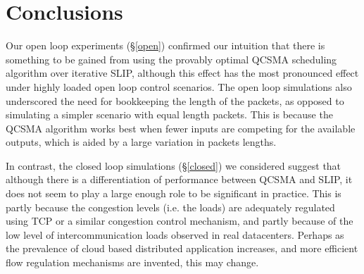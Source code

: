 \documentclass[11pt]{article}%
\begin{document}
\section{Conclusions}

Our open loop experiments (\S\ref{open}) confirmed our intuition that there is something to be gained from using the provably optimal QCSMA scheduling algorithm over iterative SLIP, although this effect has the most pronounced effect under highly loaded open loop control scenarios.  The open loop simulations also underscored the need for bookkeeping the length of the packets, as opposed to simulating a simpler scenario with equal length packets.  This is because the QCSMA algorithm works best when fewer inputs are competing for the available outputs, which is aided by a large variation in packets lengths.

In contrast, the closed loop simulations (\S \ref{closed}) we considered suggest that although there is a differentiation of performance between QCSMA and SLIP, it does not seem to play a large enough role to be significant in practice.  This is partly because the congestion levels (i.e. the loads) are adequately regulated using TCP or a similar congestion control mechanism, and partly because of the low level of intercommunication loads observed in real datacenters.  Perhaps as the prevalence of cloud based distributed application increases, and more efficient flow regulation mechanisms are invented, this may change.
\end{document}
